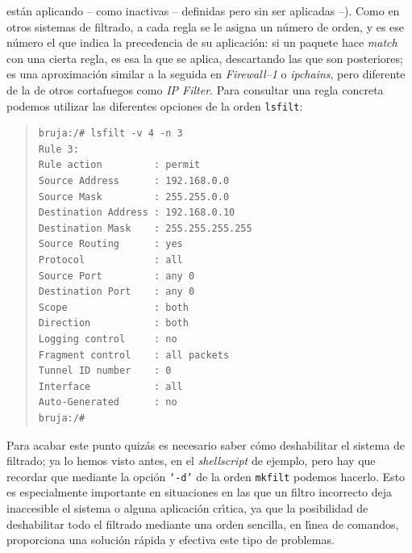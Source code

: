 est\'an aplicando -- como inactivas -- definidas pero sin ser aplicadas --). 
Como en otros sistemas de filtrado, a cada regla se le asigna un n\'umero de
orden, y es ese n\'umero el que indica la precedencia de su aplicaci\'on: si
un paquete hace {\it match} con una cierta regla, es esa la que se aplica, 
descartando las que son posteriores; es una aproximaci\'on similar a la seguida
en {\it Firewall--1} o {\it ipchains}, pero diferente de la de otros cortafuegos
como {\it IP Filter}. Para consultar una regla concreta podemos utilizar las
diferentes opciones de la orden {\tt lsfilt}:
\begin{quote}
\begin{verbatim}
bruja:/# lsfilt -v 4 -n 3
Rule 3:
Rule action         : permit
Source Address      : 192.168.0.0
Source Mask         : 255.255.0.0
Destination Address : 192.168.0.10
Destination Mask    : 255.255.255.255
Source Routing      : yes
Protocol            : all
Source Port         : any 0
Destination Port    : any 0
Scope               : both
Direction           : both
Logging control     : no
Fragment control    : all packets
Tunnel ID number    : 0
Interface           : all
Auto-Generated      : no
bruja:/#
\end{verbatim}
\end{quote}
Para acabar este punto quiz\'as es necesario saber c\'omo deshabilitar el 
sistema de filtrado; ya lo hemos visto antes, en el {\it shellscript} de 
ejemplo, pero hay que recordar que mediante la opci\'on {\tt `-d'} de la orden 
{\tt mkfilt} podemos hacerlo. Esto es especialmente importante en situaciones en
las que un filtro incorrecto deja inaccesible el sistema o alguna aplicaci\'on
cr\'{\i}tica, ya que la posibilidad de deshabilitar todo el filtrado mediante
una orden sencilla, en l\'{\i}nea de comandos, proporciona una soluci\'on 
r\'apida y efectiva este tipo de problemas.
